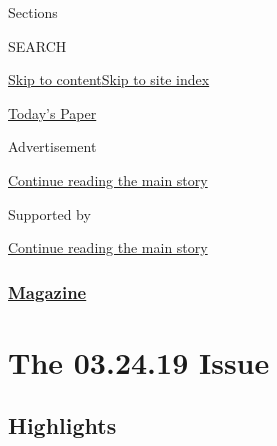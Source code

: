 Sections

SEARCH

\protect\hyperlink{site-content}{Skip to
content}\protect\hyperlink{site-index}{Skip to site index}

\href{https://myaccount.nytimes3xbfgragh.onion/auth/login?response_type=cookie\&client_id=vi}{}

\href{https://www.nytimes3xbfgragh.onion/section/todayspaper}{Today's
Paper}

Advertisement

\protect\hyperlink{after-top}{Continue reading the main story}

Supported by

\protect\hyperlink{after-sponsor}{Continue reading the main story}

\hypertarget{magazine}{%
\subsubsection{\texorpdfstring{\href{/section/magazine}{Magazine}}{Magazine}}\label{magazine}}

\hypertarget{the-032419-issue}{%
\section{The 03.24.19 Issue}\label{the-032419-issue}}

\hypertarget{highlights}{%
\subsection{Highlights}\label{highlights}}

